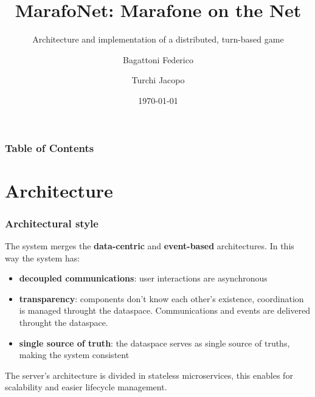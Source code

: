\documentclass{beamer}
\title[MarafoNet]{MarafoNet: Marafone on the Net}
\subtitle{Architecture and implementation of a distributed, turn-based game}
\author[F. Bagattoni, J. Turchi]{Bagattoni Federico\and Turchi Jacopo}
\institute[UniBo]{Alma Mater Studiorum - Università di Bologna}
\date{\today}
\begin{document}
\frame{\titlepage}

\begin{frame}
\frametitle{Table of Contents}
\tableofcontents
\end{frame}

\section{Architecture}\label{sec:arch}

\begin{frame}
\frametitle{Architectural style}
The system merges the \textbf{data-centric} and \textbf{event-based} architectures. In this way the system has:
\begin{itemize}
    \item \textbf{decoupled communications}: user interactions are asynchronous
    \item \textbf{transparency}: components don't know each other's existence, coordination is managed
        throught the dataspace. Communications and events are delivered throught the dataspace.
    \item \textbf{single source of truth}: the dataspace serves as single source of truths, making the system consistent
\end{itemize}

The server's architecture is divided in stateless microservices, this enables for scalability and
easier lifecycle management. 

\end{frame}
\end{document}
